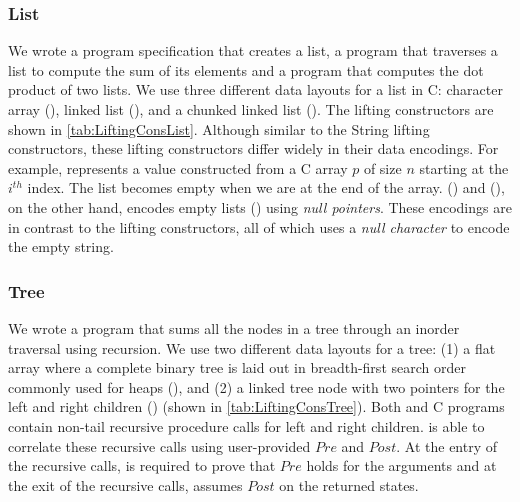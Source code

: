 \subsubsection{List}
\vspace{-5px}
We wrote a \SpecL{} program specification that creates a list, a
program that traverses a list to compute the sum of its elements and a program
that computes the dot product of two lists. We use three different
data layouts for a list in C: character array (),
linked list (), and
a chunked linked list ().
The lifting constructors are shown in \cref{tab:LiftingConsList}.
Although similar to the String lifting constructors, these lifting
constructors differ widely in their data encodings. For example,
 represents a  value constructed
from a C array $p$ of size $n$ starting at the $i^{th}$ index. The list becomes empty
when we are at the end of the array. ()
and (), on the other hand, encodes empty
lists () using {\em null pointers}. These encodings are in contrast to the
 lifting constructors, all of which uses a {\em null character} to
encode the empty string.


\vspace{-15px}
\subsubsection{Tree}
\vspace{-5px}
We wrote a \SpecL{} program that sums all the nodes in a tree
through an inorder traversal using recursion. We use two different data layouts for a tree: 
(1) a flat array where a
complete binary tree is laid out in breadth-first search order commonly used for heaps (),
and (2) a linked tree node with two pointers for the left and right children () (shown in \cref{tab:LiftingConsTree}).
Both \SpecL{} and C programs contain non-tail recursive procedure calls for left and right children.
\toolName{} is able to correlate these recursive calls using user-provided $Pre$ and $Post$.
At the entry of the recursive calls, \toolName{} is required to prove that $Pre$ holds for the arguments
and at the exit of the recursive calls, \toolName{} assumes $Post$ on the returned states.


\vspace{-10px}
